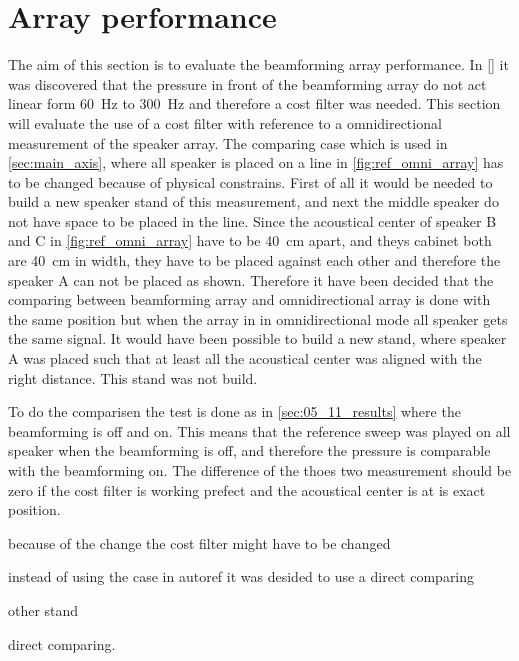 \section{Array performance}

The aim of this section is to evaluate the beamforming array performance. In \autoref{} it was discovered that the pressure in front of the beamforming array do not act linear form \SI{60}{\hertz} to \SI{300}{\hertz} and therefore a cost filter was needed. This section will evaluate the use of a cost filter with reference to a omnidirectional measurement of the speaker array. The comparing case which is used in \autoref{sec:main_axis}, where all speaker is placed on a line in \autoref{fig:ref_omni_array} has to be changed because of physical constrains. First of all it would be needed to build a new speaker stand of this measurement, and next the middle speaker do not have space to be placed in the line. Since the acoustical center of speaker B and C in \autoref{fig:ref_omni_array} have to be \SI{40}{\centi\meter} apart, and theys cabinet both are \SI{40}{\centi\meter} in width, they have to be placed against each other and therefore the speaker A can not be placed as shown. Therefore it have been decided that the comparing between beamforming array and omnidirectional array is done with the same position but when the array in in omnidirectional mode all speaker gets the same signal. It would have been possible to build a new stand, where speaker A was placed such that at  least all the acoustical center was aligned with the right distance. This stand was not build.

To do the comparisen the test is done as in \autoref{sec:05_11_results} where the beamforming is off and on. This means that the reference sweep was played on all speaker when the beamforming is off, and therefore the pressure is comparable with the beamforming on. The difference of the thoes two measurement should be zero if the cost filter is working prefect and the acoustical center is at is exact position. 






because of the change the cost filter might have to be changed 


instead of using the case in autoref{} it was desided to use a direct comparing 

other stand

direct comparing.